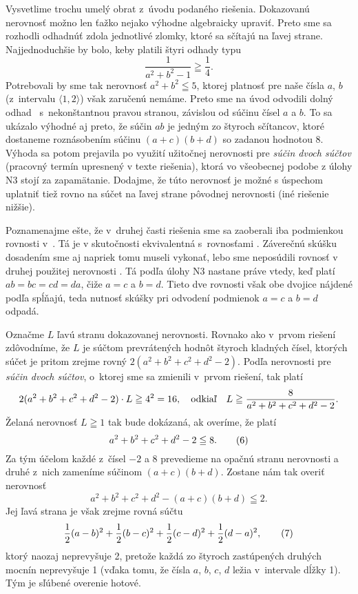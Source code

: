{\poznamka
Vysvetlime trochu umelý obrat z~úvodu podaného
riešenia. Dokazovanú nerovnosť možno len ťažko nejako
výhodne algebraicky upraviť. Preto sme sa rozhodli odhadnúť
zdola jednotlivé zlomky, ktoré sa sčítajú na ľavej strane.
Najjednoduchšie by bolo, keby platili štyri odhady typu
$$
\frac{1}{a^2+b^2-1}\geqq\frac{1}{4}.
$$
Potrebovali by sme tak nerovnosť $a^2+b^2\leqq5$,
ktorej platnosť pre naše čísla $a$, $b$ (z~intervalu $\langle1,2\rangle$)
však zaručenú nemáme.
Preto sme na úvod odvodili dolný odhad~ s~nekonštantnou pravou stranou,
závislou od súčinu čísel $a$ a $b$. To sa ukázalo výhodné
aj preto, že
súčin $ab$ je jedným zo štyroch sčítancov, ktoré dostaneme
roznásobením súčinu $(a+c)(b+d)$ so zadanou hodnotou 8.
Výhoda sa potom prejavila po využití užitočnej
nerovnosti  pre
{\it súčin dvoch súčtov} (pracovný termín upresnený
v texte riešenia), ktorá vo všeobecnej podobe z úlohy N3 stojí za
zapamätanie. Dodajme, že túto nerovnosť
je možné s úspechom uplatniť tiež rovno na súčet
na ľavej strane pôvodnej nerovnosti (iné riešenie nižšie).

Poznamenajme ešte, že v~druhej časti riešenia sme sa zaoberali iba
podmienkou rovnosti v~. Tá je v skutočnosti ekvivalentná
s~rovnosťami . Záverečnú skúšku
dosadením sme aj napriek tomu museli vykonať, lebo sme neposúdili
rovnosť v druhej použitej nerovnosti . Tá podľa úlohy N3 nastane
práve vtedy, keď platí $ab=bc=cd=da$, čiže $a=c$ a $b=d$. Tieto dve
rovnosti však obe dvojice nájdené podľa  spĺňajú, teda
nutnosť skúšky pri odvodení podmienok $a=c$ a $b=d$ odpadá.

\ineriesenie
Označme $L$ ľavú stranu dokazovanej
nerovnosti. Rovnako ako v~prvom riešení zdôvodníme, že $L$ je
súčtom prevrátených hodnôt štyroch kladných čísel, ktorých
súčet je pritom zrejme rovný $2(a^2+b^2+c^2+d^2-2)$.
Podľa nerovnosti pre {\it súčin dvoch súčtov},
o~ktorej sme sa zmienili v~prvom
riešení, tak platí
$$
2(a^2+b^2+c^2+d^2-2)\cdot L\geqq 4^2=16,\quad\hbox{odkiaľ}
\quad L\geqq\frac{8}{a^2+b^2+c^2+d^2-2}.
$$
Želaná nerovnosť $L\geqq1$ tak bude dokázaná,
ak overíme, že platí
$$
a^2+b^2+c^2+d^2-2\leqq8.
\tag6
$$
Za tým účelom každé z~čísel ${-2}$ a $8$ prevedieme na opačnú stranu
nerovnosti a druhé z~nich zameníme súčinom $(a+c)(b+d)$. Zostane nám tak
overiť nerovnosť
$$
a^2+b^2+c^2+d^2-(a+c)(b+d)\leqq2.
$$
Jej ľavá strana je však zrejme rovná súčtu
$$
\frac12(a-b)^2+\frac12(b-c)^2+\frac12(c-d)^2+\frac12(d-a)^2,
\tag7
$$
ktorý naozaj neprevyšuje 2, pretože každá zo štyroch
zastúpených druhých mocnín neprevyšuje 1 (vďaka tomu, že čísla $a$, $b$,
$c$, $d$ ležia v~intervale dĺžky 1). Tým je sľúbené overenie hotové.

}
